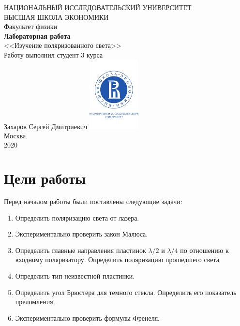 \documentclass[a4paper, 12pt]{article}
\begin{document}
	\begin{titlepage}
		\begin{center}
			$$$$
			$$$$
			$$$$
			$$$$
			{\Large{НАЦИОНАЛЬНЫЙ ИССЛЕДОВАТЕЛЬСКИЙ УНИВЕРСИТЕТ}}\\
			\vspace{0.1cm}
			{\Large{ВЫСШАЯ ШКОЛА ЭКОНОМИКИ}}\\
			\vspace{0.25cm}
			{\large{Факультет физики}}\\
			\vspace{5.5cm}
			{\Huge\textbf{{Лабораторная работа}}}\\%
			\vspace{1cm}
			{\LARGE{<<Изучение поляризованного света>>}}\\%
			\vspace{2cm}
			{Работу выполнил студент 3 курса}\\
			{Захаров Сергей Дмитриевич}
			\vfill
			\includegraphics[width = 0.2\textwidth]{HSElogo}\\
			\vfill
			Москва\\
			2020
		\end{center}
	\end{titlepage}
	
\tableofcontents

\newpage

\section{Цели работы}

Перед началом работы были поставлены следующие задачи:

\begin{enumerate}
	\item Определить поляризацию света от лазера.
	
	\item Экспериментально проверить закон Малюса.
	
	\item Определить главные направления пластинок $\lambda/2$ и $\lambda/4$ по отношению к входному поляризатору. Определить поляризацию прошедшего света.
	
	\item Определить тип неизвестной пластинки.
	
	\item Определить угол Брюстера для темного стекла. Определить его показатель преломления.
	
	\item Экспериментально проверить формулы Френеля.
\end{enumerate}
\end{document}

